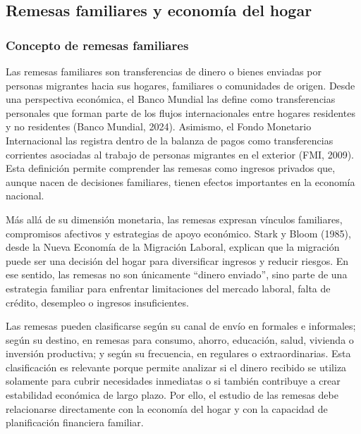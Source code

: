 \documentclass[12pt,letterpaper]{article}
\begin{document}
\subsection{\texorpdfstring{\textbf{Remesas familiares y economía del hogar}}{Remesas familiares y economía del hogar}}\label{remesas-familiares-y-economuxeda-del-hogar}

\subsubsection{\texorpdfstring{\textbf{Concepto de remesas familiares}}{Concepto de remesas familiares}}\label{concepto-de-remesas-familiares}

Las remesas familiares son transferencias de dinero o bienes enviadas por personas migrantes hacia sus hogares, familiares o comunidades de origen. Desde una perspectiva económica, el Banco Mundial las define como transferencias personales que forman parte de los flujos internacionales entre hogares residentes y no residentes (Banco Mundial, 2024). Asimismo, el Fondo Monetario Internacional las registra dentro de la balanza de pagos como transferencias corrientes asociadas al trabajo de personas migrantes en el exterior (FMI, 2009). Esta definición permite comprender las remesas como ingresos privados que, aunque nacen de decisiones familiares, tienen efectos importantes en la economía nacional.

Más allá de su dimensión monetaria, las remesas expresan vínculos familiares, compromisos afectivos y estrategias de apoyo económico. Stark y Bloom (1985), desde la Nueva Economía de la Migración Laboral, explican que la migración puede ser una decisión del hogar para diversificar ingresos y reducir riesgos. En ese sentido, las remesas no son únicamente ``dinero enviado'', sino parte de una estrategia familiar para enfrentar limitaciones del mercado laboral, falta de crédito, desempleo o ingresos insuficientes.

Las remesas pueden clasificarse según su canal de envío en formales e informales; según su destino, en remesas para consumo, ahorro, educación, salud, vivienda o inversión productiva; y según su frecuencia, en regulares o extraordinarias. Esta clasificación es relevante porque permite analizar si el dinero recibido se utiliza solamente para cubrir necesidades inmediatas o si también contribuye a crear estabilidad económica de largo plazo. Por ello, el estudio de las remesas debe relacionarse directamente con la economía del hogar y con la capacidad de planificación financiera familiar.
\end{document}
